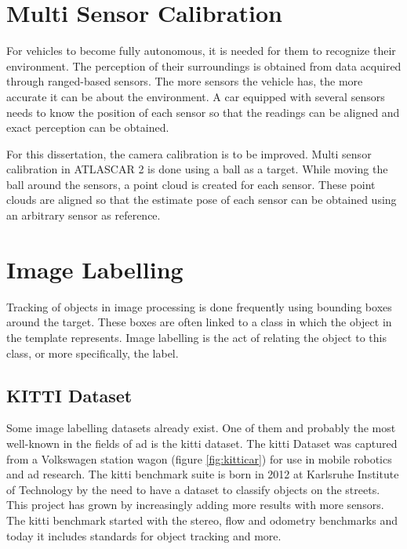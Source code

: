 \section{Multi Sensor Calibration}

For vehicles to become fully autonomous, it is needed for them to recognize their environment. The perception of their surroundings is obtained from data acquired through ranged-based sensors. The more sensors the vehicle has, the more accurate it can be about the environment. A car equipped with several sensors needs to know the position of each sensor so that the readings can be aligned and exact perception can be obtained. 

For this dissertation, the camera calibration is to be improved. Multi sensor calibration in ATLASCAR 2 is done using a ball as a target. While moving the ball around the sensors, a point cloud is created for each sensor. These point clouds are aligned so that the estimate pose of each sensor can be obtained using an arbitrary sensor as reference. \cite{VieiradaSilva2016}

\section{Image Labelling}
Tracking of objects in image processing is done frequently using bounding boxes around the target. These boxes are often linked to a class in which the object in the template represents. Image labelling is the act of relating the object to this class, or more specifically, the label. 

\subsection{KITTI Dataset}
Some image labelling datasets already exist. One of them and probably the most well-known in the fields of \gls{ad} is the \gls{kitti} dataset. \cite{KarlsruheInstituteofTechnology} The \gls{kitti} Dataset was captured from a Volkswagen station wagon (figure \ref{fig:kitticar}) for use in mobile robotics and \gls{ad} research. The \gls{kitti} benchmark suite is born in 2012 at Karlsruhe Institute of Technology by the need to have a dataset to classify objects on the streets. This project has grown by increasingly adding more results with more sensors. The \gls{kitti} benchmark started with the stereo, flow and odometry benchmarks and today it includes standards for object tracking and more. 

